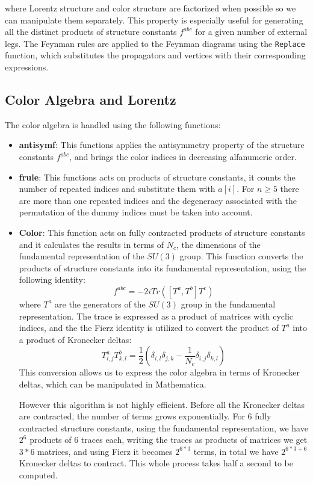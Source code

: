 \documentclass[main.tex]{subfiles}
\begin{document}
where Lorentz structure and color structure are factorized when possible so we can manipulate them separately.
This property is especially useful for generating all the distinct products of structure constants \( f^{abc} \) for a given number of external legs. 
The Feynman rules are applied to the Feynman diagrams using the \texttt{Replace} function, which substitutes the propagators and vertices with their corresponding expressions.

\subsection{Color Algebra and Lorentz}

The color algebra is handled using the following functions:

\begin{itemize}
    \item \textbf{antisymf}: This functions applies the antisymmetry property of the structure constants $f^{abc}$, 
    and brings the color indices in decreasing alfanumeric order.
    \item \textbf{frule}: This functions acts on products of structure constants, it counts the number of repeated indices and 
    substitute them with $a[i]$. For $n \ge 5$ there are more than one repeated indices and the degeneracy associated with the permutation
    of the dummy indices must be taken into account.
    \item \textbf{Color}: This function acts on fully contracted products of structure constants and it calculates the results in terms
    of $N_c$, the dimensions of the fundamental representation of the $SU(3)$ group. This function converts the products
    of structure constants into its fundamental representation, using the following identity:
    \begin{equation}
        f^{abc} = -2 i Tr \left( [T^a ,T^b] T^c \right)
    \end{equation}
    where $T^a$ are the generators of the $SU(3)$ group in the fundamental representation.
    The trace is expressed as a product of matrices with cyclic indices, and the the Fierz identity is utilized to convert the product of 
    $T^a$ into a product of Kronecker deltas:
    \begin{equation}
        T^a_{i,j} T^b_{k,l} = \frac{1}{2} \left( \delta_{i, l} \delta_{j, k} - \frac{1}{N_c} \delta_{i, j} \delta_{k, l} \right)
    \end{equation} 
    This conversion allows us to express the color algebra in terms of Kronecker deltas, which can be manipulated in Mathematica.
    
    However this algorithm is not highly efficient. Before all the Kronecker deltas are contracted, the number of terms grows exponentially.
    For 6 fully contracted structure constants, using the fundamental representation, we have $2^6$ products of $6$ traces each, writing
    the traces as products of matrices we get $3*6$ matrices, and using Fierz it becomes $2^{6*3}$ terms, in total 
    we have $2^{6*3+6}$ Kronecker deltas to contract. This whole process takes half a second to be computed.
\end{itemize}
\end{document}
